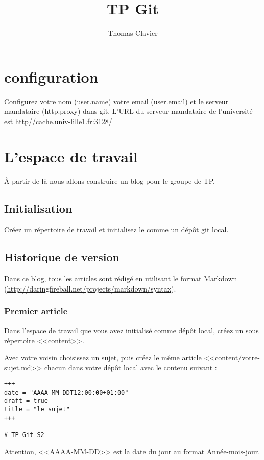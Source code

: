 \documentclass[a4paper]{article}
\title{TP Git}
\author{Thomas Clavier}
\date{}
\begin{document}
\maketitle

\section{configuration}

Configurez votre nom (user.name) votre email (user.email) et le serveur mandataire (http.proxy) dans git. L'URL du serveur mandataire de l'université est http//cache.univ-lille1.fr:3128/

\section{L'espace de travail}

À partir de là nous allons construire un blog pour le groupe de TP.

\subsection{Initialisation}
Créez un répertoire de travail et initialisez le comme un dépôt git local.

\subsection{Historique de version}
Dans ce blog, tous les articles sont rédigé en utilisant le format Markdown (\url{http://daringfireball.net/projects/markdown/syntax}).

\subsubsection{Premier article}
Dans l'espace de travail que vous avez initialisé comme dépôt local, créez un sous répertoire <<content>>.

Avec votre voisin choisissez un sujet, puis créez le même article <<content/votre-sujet.md>> chacun dans votre dépôt local avec le contenu suivant : 

\begin{verbatim}
+++
date = "AAAA-MM-DDT12:00:00+01:00"
draft = true
title = "le sujet"
+++

# TP Git S2
\end{verbatim}

Attention, <<AAAA-MM-DD>> est la date du jour au format Année-mois-jour.
\end{document}
